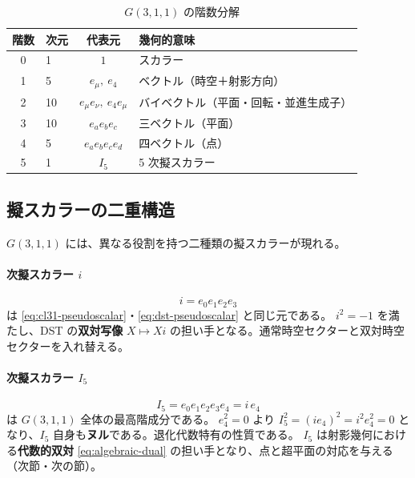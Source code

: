 \documentclass[dvipdfmx,a4paper,oneside]{jsbook}
\numberwithin{equation}{chapter}
\begin{document}
\begin{table}[htbp]
  \centering
  \caption{\(G(3,1,1)\) の階数分解}
  \label{tab:g311-grades}
  \begin{tabular}{@{}clcl@{}}
    \toprule
    階数 & 次元 & 代表元 & 幾何的意味 \\
    \midrule
    0 & 1 & \(1\) & スカラー \\
    1 & 5 & \(e_\mu,\ e_4\) & ベクトル（時空＋射影方向） \\
    2 & 10 & \(e_\mu e_\nu,\ e_4 e_\mu\) & バイベクトル（平面・回転・並進生成子） \\
    3 & 10 & \(e_a e_b e_c\) & 三ベクトル（平面） \\
    4 & 5 & \(e_a e_b e_c e_d\) & 四ベクトル（点） \\
    5 & 1 & \(I_5\) & 5 次擬スカラー \\
    \bottomrule
  \end{tabular}
\end{table}

\subsection{擬スカラーの二重構造}

\(G(3,1,1)\) には、異なる役割を持つ二種類の擬スカラーが現れる。

\paragraph{ 次擬スカラー \(i\)}
\begin{equation}
  i = e_0 e_1 e_2 e_3
  \label{eq:g311-pseudoscalar-i}
\end{equation}
は \eqref{eq:cl31-pseudoscalar}・\eqref{eq:dst-pseudoscalar} と同じ元である。
\(i^2 = -1\) を満たし、DST の\textbf{双対写像} \(X \mapsto Xi\) の担い手となる。通常時空セクターと双対時空セクターを入れ替える。

\paragraph{ 次擬スカラー \(I_5\)}
\begin{equation}
  I_5 = e_0 e_1 e_2 e_3 e_4 = i\, e_4
  \label{eq:I5-pseudoscalar}
\end{equation}
は \(G(3,1,1)\) 全体の最高階成分である。
\(e_4^2 = 0\) より \(I_5^2 = (i e_4)^2 = i^2 e_4^2 = 0\) となり、\(I_5\) 自身も\textbf{ヌル}である。退化代数特有の性質である。
\(I_5\) は射影幾何における\textbf{代数的双対} \eqref{eq:algebraic-dual} の担い手となり、点と超平面の対応を与える（次節・次の節）。
\end{document}
